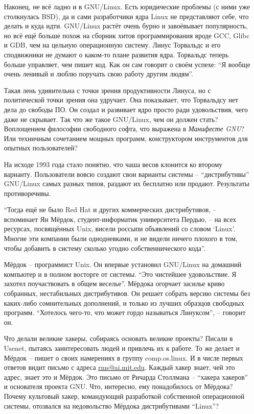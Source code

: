 Наконец, не всё ладно и в GNU/Linux. Есть юридические проблемы (с ними уже столкнулась BSD), да и сами разработчики ядра Linux не представляют себе, что делать и куда идти. GNU/Linux растёт очень бурно и завоёвывает популярность, но всё ещё больше похож на сборник хитов программирования вроде GCC, Glibc и GDB, чем на цельную операционную систему. Линус Торвальдс и его сподвижники не думают о каком-то плане развития ядра. Торвальдс теперь больше управляет, чем пишет код. Как он сам говорит о своём успехе: ``Я вообще очень ленивый и люблю поручать свою работу другим людям''.

Такая лень удивительна с точки зрения продуктивности Линуса, но с политической точки зрения она удручает. Она показывает, что Торвальдсу нет дела до свободы ПО. Он создал и развивает ядро просто ради удовольствия, чего даже не скрывает. Так что же такое GNU/Linux, чем он должен стать? Воплощением философии свободного софта, что выражена в \textit{Манифесте GNU}? Или техничным сочетанием мощных программ, конструктором инструментов для опытных пользователей?

На исходе 1993 года стало понятно, что чаша весов клонится ко второму варианту. Пользователи вовсю создают свои варианты системы -- ``дистрибутивы'' GNU/Linux самых разных типов, раздают их бесплатно или продают. Результаты противоречивы.

``Тогда ещё не было Red Hat и других коммерческих дистрибутивов, -- вспоминает Ян Мёрдок, студент-информатик университета Пердью, -- на всех ресурсах, посвящённых Unix, висели россыпи объявлений со словом `Linux'. Многие эти компании были однодневками, и не видели ничего плохого в том, чтобы добавить в систему сколько угодно собственнического кода''.

Мёрдок -- программист Unix. Он впервые установил GNU/Linux на домашний компьютер и в полном восторге от системы. ``Это чистейшее удовольствие. Я захотел поучаствовать в общем веселье''. Мёрдока огорчает засилье криво собранных, нестабильных дистрибутивов. Он решает собрать версию системы без каких-либо сомнительных дополнений, и только из лучших образцов свободных программ. ``Хотелось чего-то, что может гордо называться Линуксом'', -- говорит он.

Что делали великие хакеры, собираясь основать великие проекты? Писали в Usenet, пытаясь заинтересовать людей и привлечь их к работе. То же делает и Мёрдок -- пишет о своих намерениях в группу comp.os.linux. И в числе первых ответов видит письмо с адреса \url{rms@ai.mit.edu}. Каждый хакер знает, чей это адрес, знает это и Мёрдок. Это письмо от Ричарда Столлмана -- ``хакера хакеров'' и основателя проекта GNU. Что, интересно, ему понадобилось от Мёрдока? Почему культовый хакер, командующий разработкой собственной операционной системы, отозвался на недовольство Мёрдока дистрибутивами ``Linux''?

